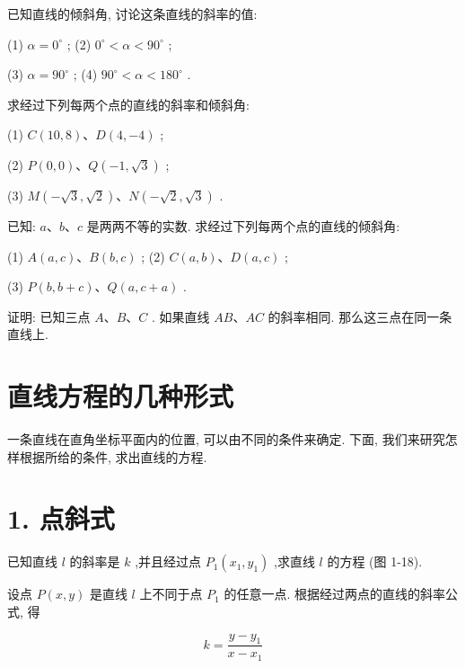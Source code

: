\documentclass[lang=cn,newtx,12pt,scheme=chinese]{elegantbook}
\begin{document}
\begin{problemset}[练习]

\item 已知直线的倾斜角, 讨论这条直线的斜率的值:

(1) \(\alpha = {0}^{ \circ }\) ; (2) \({0}^{ \circ } < \alpha < {90}^{ \circ }\) ;

(3) \(\alpha = {90}^{ \circ }\) ; (4) \({90}^{ \circ } < \alpha < {180}^{ \circ }\) .

\item 求经过下列每两个点的直线的斜率和倾斜角:

(1) \(C\left( {{10},8}\right) \text{、}D\left( {4, - 4}\right)\) ;

(2) \(P\left( {0,0}\right) \text{、}Q\left( {-1,\sqrt{3}}\right)\) ;

(3) \(M\left( {-\sqrt{3},\sqrt{2}}\right) \text{、}N\left( {-\sqrt{2},\sqrt{3}}\right)\) .

\item 已知: \(a\text{、}b\text{、}c\) 是两两不等的实数. 求经过下列每两个点的直线的倾斜角:

(1) \(A\left( {a,c}\right) \text{、}B\left( {b,c}\right)\) ; (2) \(C\left( {a,b}\right) \text{、}D\left( {a,c}\right)\) ;

(3) \(P\left( {b,b + c}\right) \text{、}Q\left( {a,c + a}\right)\) .

\item 证明: 已知三点 \(A\text{、}B\text{、}C\) . 如果直线 \({AB}\text{、}{AC}\) 的斜率相同. 那么这三点在同一条直线上.
\end{problemset}

\section{直线方程的几种形式}

一条直线在直角坐标平面内的位置, 可以由不同的条件来确定. 下面, 我们来研究怎样根据所给的条件, 求出直线的方程.

\section*{1. 点斜式}

已知直线 \(l\) 的斜率是 \(k\) ,并且经过点 \({P}_{1}\left( {{x}_{1},{y}_{1}}\right)\) ,求直线 \(l\) 的方程 (图 1-18).

设点 \(P\left( {x,y}\right)\) 是直线 \(l\) 上不同于点 \({P}_{1}\) 的任意一点. 根据经过两点的直线的斜率公式, 得

\[
  k = \frac{y - {y}_{1}}{x - {x}_{1}}
\]
\end{document}
